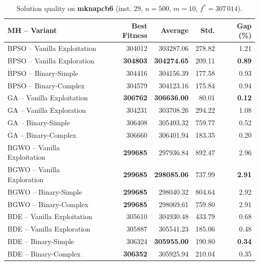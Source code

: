 \documentclass[journal,article,submit,moreauthors]{Definitions/mdpi}
\begin{document}
\begin{table}[htbp]
  \centering
  \small
  \caption{Solution quality on \textbf{mknapcb6} (inst. 29, $n=500$, $m=10$, $f^*=307\,014$).}
  \label{tab:calidad_mknapcb6_29}
  \begin{tabular}{lrrrr}
    \toprule
    \textbf{MH -- Variant} &
    \textbf{Best Fitness} &
    \textbf{Average} &
    \textbf{Std.} &
    \textbf{Gap (\%)} \\
    \midrule
    BPSO -- Vanilla Exploitation &         304012 &        303287.06 & 278.82 &         1.21 \\
    BPSO -- Vanilla Exploration  & \textbf{304803} & \textbf{304274.65} & 209.11 & \textbf{0.89} \\
    BPSO -- Binary-Simple        &         304416 &        304156.39 & 177.58 &         0.93 \\
    BPSO -- Binary-Complex       &         304579 &        304123.16 & 175.84 &         0.94 \\
    \midrule
    GA -- Vanilla Exploitation   & \textbf{306762} & \textbf{306636.00} &  80.01 & \textbf{0.12} \\
    GA -- Vanilla Exploration    &         304231 &        303708.26 & 294.22 &         1.08 \\
    GA -- Binary-Simple          &         306408 &        305403.32 & 759.77 &         0.52 \\
    GA -- Binary-Complex         &         306660 &        306401.94 & 183.35 &         0.20 \\
    \midrule
    BGWO -- Vanilla Exploitation & \textbf{299685} &        297936.84 & 892.47 &         2.96 \\
    BGWO -- Vanilla Exploration  & \textbf{299685} & \textbf{298085.06} & 737.99 & \textbf{2.91} \\
    BGWO -- Binary-Simple        & \textbf{299685} &        298040.32 & 804.64 &         2.92 \\
    BGWO -- Binary-Complex       & \textbf{299685} &        298069.61 & 759.80 &         2.91 \\
    \midrule
    BDE -- Vanilla Exploitation  &         305610 &        304930.48 & 433.79 &         0.68 \\
    BDE -- Vanilla Exploration   &         305887 &        305541.23 & 185.06 &         0.48 \\
    BDE -- Binary-Simple         &         306324 & \textbf{305955.00} & 190.80 & \textbf{0.34} \\
    BDE -- Binary-Complex        & \textbf{306352} &        305925.94 & 210.04 &         0.35 \\
    \bottomrule
  \end{tabular}
\end{table}
\end{document}
